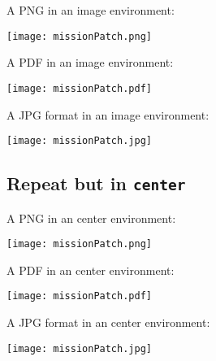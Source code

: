 \documentclass{ximera}
\begin{document}
%
%    
\hrulefill

A PNG in an image environment:
\begin{image}
    \texttt{[image: missionPatch.png]}
\end{image}

\hrulefill

A PDF in an image environment:

\begin{image}
    \texttt{[image: missionPatch.pdf]}
\end{image}

\hrulefill

A JPG format in an image environment:

\begin{image}
    \texttt{[image: missionPatch.jpg]}
\end{image}

\hrulefill

\subsection{Repeat but in \texttt{center}}

\begin{center}
  \end{center}


%
%    
\hrulefill

A PNG in an center environment:
\begin{center}
    \texttt{[image: missionPatch.png]}
\end{center}

\hrulefill

A PDF in an center environment:

\begin{center}
    \texttt{[image: missionPatch.pdf]}
\end{center}

\hrulefill

A JPG format in an center environment:

\begin{center}
    \texttt{[image: missionPatch.jpg]}
\end{center}
\end{document}
